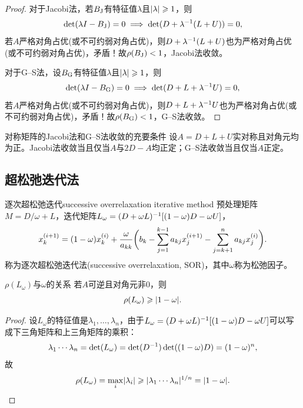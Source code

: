 \begin{proof}
    对于Jacobi法，若$B_\text J$有特征值$\lambda$且$\lvert\lambda\rvert \geqslant 1$，则
    \[
        \det(\lambda I - B_\text J) = 0 \implies \det(D + \lambda^{-1}(L + U)) = 0,
    \]
    若$A$严格对角占优(或不可约弱对角占优)，则$D + \lambda^{-1}(L + U)$也为严格对角占优(或不可约弱对角占优)，矛盾！故$\rho(B_\text J) < 1$，Jacobi法收敛。

    对于G--S法，设$B_\text G$有特征值$\lambda$且$\lvert\lambda\rvert \geqslant 1$，则
    \[
        \det(\lambda I - B_\text G) = 0 \implies \det(D + L + \lambda^{-1} U) = 0,
    \]
    若$A$严格对角占优(或不可约弱对角占优)，则$D + L + \lambda^{-1} U$也为严格对角占优(或不可约弱对角占优)，矛盾！故$\rho(B_\text G) < 1$，G--S法收敛。
\end{proof}

\begin{theorem}
    {对称矩阵的Jacobi法和G--S法收敛的充要条件}{}
    设$A = D + L + U$实对称且对角元均为正。Jacobi法收敛当且仅当$A$与$2D - A$均正定；G--S法收敛当且仅当$A$正定。
\end{theorem}

\subsection{超松弛迭代法}

\begin{example}
    {逐次超松弛迭代}{successive overrelaxation iterative method}
    预处理矩阵$M = D/\omega + L$，迭代矩阵$L_\omega = (D + \omega L)^{-1}[(1 - \omega)D - \omega U]$，
    \begin{equation}
        x_k^{(i+1)} = (1 - \omega)x_k^{(i)} + \frac\omega{a_{kk}}\biggl(b_k - \sum_{j=1}^{k-1}a_{kj}x_j^{(i+1)} - \sum_{j=k+1}^na_{kj}x_j^{(i)}\biggr).
    \end{equation}
    称为逐次超松弛迭代法(successive overrelaxation, SOR)，其中$\omega$称为松弛因子。
\end{example}

\begin{theorem}
    {$\rho(L_\omega)$与$\omega$的关系}{}
    若$A$可逆且对角元非0，则
    \begin{equation}
        \rho(L_\omega) \geqslant \lvert1 - \omega\rvert.
    \end{equation}
\end{theorem}

\begin{proof}
    设$L_\omega$的特征值是$\lambda_1,\ldots,\lambda_n$，由于$L_\omega = (D + \omega L)^{-1}[(1 - \omega)D - \omega U]$可以写成下三角矩阵和上三角矩阵的乘积：
    \[
        \lambda_1\cdots\lambda_n = \det(L_\omega) = \det(D^{-1})\det((1 - \omega)D) = (1 - \omega)^n,
    \]
    故
    \[
        \rho(L_\omega) = \max_i\lvert\lambda_i\rvert \geqslant \lvert\lambda_1\cdots\lambda_n\rvert^{1/n} = \lvert1 - \omega\rvert.
        \qedhere
    \]
\end{proof}

